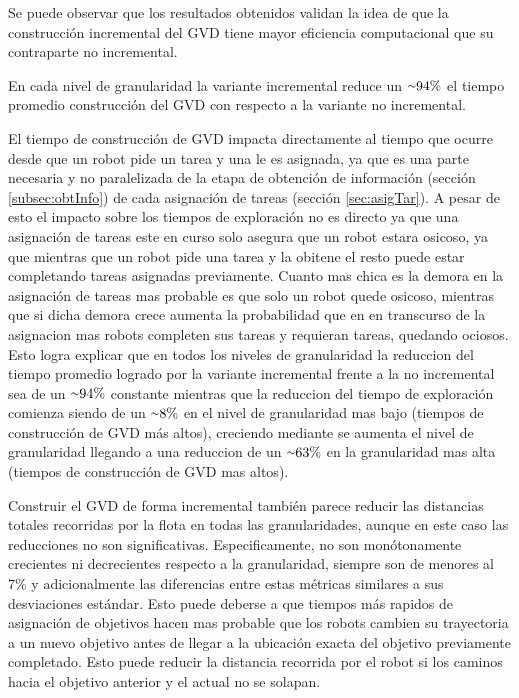 Se puede observar que los resultados obtenidos validan la idea de que la
construcción incremental del GVD tiene mayor eficiencia computacional que su
contraparte no incremental. 

En cada nivel de granularidad la variante incremental reduce un ${\smallsim}94\%$ el
tiempo promedio construcción del GVD con respecto a la variante no incremental. 

El tiempo de construcción de GVD impacta directamente al tiempo que ocurre
desde que un robot pide un tarea y una le es asignada, ya que es una parte 
necesaria y no paralelizada de la etapa de obtención de información
(sección \ref{subsec:obtInfo}) de cada asignación de tareas (sección
\ref{sec:asigTar}). A pesar de esto el impacto sobre los tiempos de exploración
no es directo ya que una asignación de tareas este en curso solo asegura que un
robot estara osicoso, ya que mientras que un robot pide una tarea y la obitene
el resto puede estar completando tareas asignadas previamente. Cuanto mas chica
es la demora en la asignación de tareas mas probable es que solo un robot quede
osicoso, mientras que si dicha demora crece aumenta la probabilidad que en en
transcurso de la asignacion mas robots completen sus tareas y requieran tareas,
quedando ociosos. Esto logra explicar que en todos los niveles de granularidad
la reduccion del tiempo promedio logrado por la variante incremental frente a
la no incremental sea de un ${\smallsim}94\%$ constante mientras que la
reduccion del tiempo de exploración comienza siendo de un ${\smallsim}8\%$ en
el nivel de granularidad mas bajo (tiempos de construcción de GVD más altos),
creciendo mediante se aumenta el nivel de granularidad llegando a una reduccion
de un ${\smallsim}63\%$ en la granularidad mas alta (tiempos de construcción de
GVD mas altos).

Construir el GVD de forma incremental también parece reducir las distancias
totales recorridas por la flota en todas las granularidades, aunque en este
caso las reducciones no son significativas. Especificamente, no son
monótonamente crecientes ni decrecientes respecto a la granularidad, siempre
son de menores al $7\%$ y adicionalmente las diferencias entre estas métricas
similares a sus desviaciones estándar. Esto puede deberse a que tiempos más
rapidos de asignación de objetivos hacen mas probable que los robots cambien su
trayectoria a un nuevo objetivo antes de llegar a la ubicación exacta del
objetivo previamente completado. Esto puede reducir la distancia recorrida por
el robot si los caminos hacia el objetivo anterior y el actual no se solapan.

